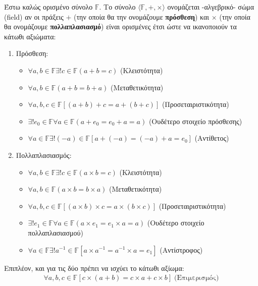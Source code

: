 \documentclass[main.tex]{subfiles}
\begin{document}
	\begin{definition}
		Έστω καλώς ορισμένο σύνολο $\mathbb{F}$. Το σύνολο $\langle\mathbb{F}, +, \times\rangle$ ονομάζεται -αλγεβρικό- σώμα (field) αν οι πράξεις $+$ (την οποία θα την ονομάζουμε \textbf{πρόσθεση}) και $\times$ (την οποία θα ονομάζουμε \textbf{πολλαπλασιασμό}) είναι ορισμένες έτσι ώστε να ικανοποιούν τα κάτωθι αξιώματα:
		\begin{enumerate}
			\item Πρόσθεση:
		 	\begin{itemize}
		 		\item $\forall a, b\in\mathbb{F}\exists! c\in\mathbb{F}(a + b = c)$ (Κλειστότητα)
		 		\item $\forall a, b\in\mathbb{F}(a + b = b + a)$ (Μεταθετικότητα)
		 		\item $\forall a, b, c\in\mathbb{F}[(a + b) + c = a + (b + c)]$ (Προσεταιριστικότητα)
		 		\item $\exists! e_0\in\mathbb{F}\forall a\in\mathbb{F}(a + e_0 = e_0 + a = a)$ (Ουδέτερο στοιχείο πρόσθεσης)
		 		\item $\forall a \in\mathbb{F}\exists!(-a)\in\mathbb{F}[a + (-a) = (-a) + a = e_0]$ (Αντίθετος)
		 	\end{itemize}
		 	\item Πολλαπλασιασμός:
		 	\begin{itemize}
		 		\item $\forall a, b\in\mathbb{F}\exists! c\in\mathbb{F}(a \times b = c)$ (Κλειστότητα)
		 		\item $\forall a, b\in\mathbb{F}(a \times b = b \times a)$ (Μεταθετικότητα)
		 		\item $\forall a, b, c\in\mathbb{F}[(a \times b) \times c = a \times (b \times c)]$ (Προσεταιριστικότητα)
		 		\item $\exists! e_1\in\mathbb{F}\forall a\in\mathbb{F}(a \times e_1 = e_1 \times a = a)$ (Ουδέτερο στοιχείο πολλαπλασιασμού)
		 		\item $\forall a \in\mathbb{F}\exists!a^{-1}\in\mathbb{F}[a \times a^{-1} = a^{-1} \times a = e_1]$ (Αντίστροφος)
		 	\end{itemize}
		\end{enumerate}
	 	
	 	Επιπλέον, και για τις δύο πρέπει να ισχύει το κάτωθι αξίωμα:
	 	\begin{align*}
	 		\forall a, b, c \in \mathbb{F}[c\times(a + b) = c\times a + c\times b] \; \text{(Επιμερισμός)}
	 	\end{align*}
 	\end{definition}
 
\end{document}
